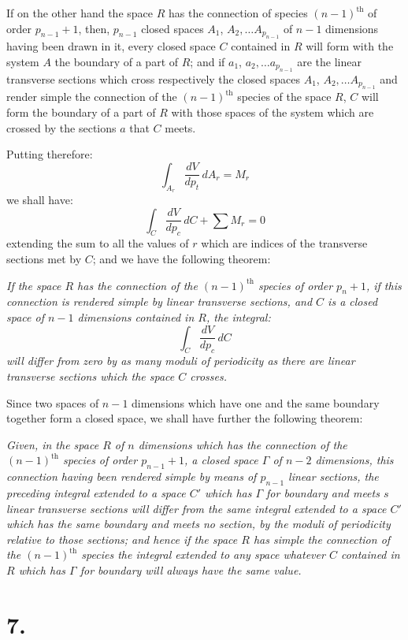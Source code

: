 \documentclass{article}
\begin{document}
If on the other hand the space $R$ has the connection of species $(n-1)^{\text{th}}$ of order $p_{n-1}+1$, then, $p_{n-1}$ closed spaces $A_{1}$, $A_{2},\ldots A_{p_{n-1}}$ of $n-1$ dimensions having been drawn in it, every closed space $C$ contained in $R$ will form with the system $A$ the boundary of a part of $R$; and if $a_{1}$, $a_{2},\ldots a_{p_{n-1}}$ are the linear transverse sections which cross respectively the closed spaces $A_{1}$, $A_{2},\ldots A_{p_{n-1}}$ and render simple the connection of the $(n-1)^{\text{th}}$ species of the space $R$, $C$ will form the boundary of a part of $R$ with those spaces of the system which are crossed by the sections $a$ that $C$ meets.

Putting therefore:
\[ \int_{A_{r}} \frac{dV}{dp_{t}}\,dA_{r} = M_{r} \]
we shall have:
\[ \int_{C} \frac{dV}{dp_{c}}\,dC + \sum M_{r} = 0 \]
extending the sum to all the values of $r$ which are indices of the transverse sections met by $C$; and we have the following theorem:

\emph{If the space $R$ has the connection of the $(n-1)^{\text{th}}$ species of order $p_{n}+1$, if this connection is rendered simple by linear transverse sections, and $C$ is a closed space of $n-1$ dimensions contained in $R$, the integral:}
\[ \int_{C} \frac{dV}{dp_{c}}\,dC \]
\emph{will differ from zero by as many moduli of periodicity as there are linear transverse sections which the space $C$ crosses.}

Since two spaces of $n-1$ dimensions which have one and the same boundary together form a closed space, we shall have further the following theorem:


\emph{Given, in the space $R$ of $n$ dimensions which has the connection of the $(n-1)^{\text{th}}$ species of order $p_{n-1}+1$, a closed space $\Gamma$ of $n-2$ dimensions, this connection having been rendered simple by means of $p_{n-1}$ linear sections, the preceding integral extended to a space $C'$ which has $\Gamma$ for boundary and meets $s$ linear transverse sections will differ from the same integral extended to a space $C'$ which has the same boundary and meets no section, by the moduli of periodicity relative to those sections; and hence if the space $R$ has simple the connection of the $(n-1)^{\text{th}}$ species the integral extended to any space whatever $C$ contained in $R$ which has $\Gamma$ for boundary will always have the same value.}

\section*{7.}
\end{document}
